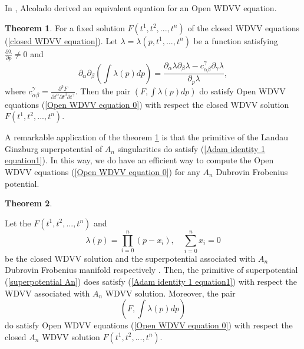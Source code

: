 \documentclass{article}
\theoremstyle{definition}
\newtheorem{theorem}{Theorem}[section]
\begin{document}
In \cite{Alcolado Adam},  Alcolado derived an equivalent equation for an Open WDVV equation.

\begin{theorem}\cite{Alcolado Adam}\label{Adam identity 10}
For a fixed solution $F(t^1, t^2, ..., t^n)$ of the closed WDVV equations (\ref{closed WDVV equation}). Let $\lambda= \lambda(p,t^1, . . . , t^n)$ be a function satisfying $\frac{\partial \lambda}{\partial p}\neq  0$ and
 \begin{equation}\label{Adam identity 1 equation1}
\partial_{\alpha}\partial_{\beta}\left(\int \lambda(p)dp\right)=\frac{ \partial_{\alpha}\lambda \partial_{\beta}\lambda-c_{\alpha\beta}^{\gamma}\partial_{\gamma}\lambda}{ \partial_{p}\lambda},
\end{equation}
where $c_{\alpha\beta}^{\gamma}=\frac{\partial^3 F}{\partial t^{\alpha}\partial t^{\beta}\partial t^{\gamma}}$.
Then the pair $(F, \int \lambda(p) dp)$ do satisfy  Open WDVV equations (\ref{Open WDVV equation 0}) with respect the closed WDVV solution $F(t^1, t^2, ..., t^n)$.


\end{theorem}


A remarkable application of the theorem \ref{Adam identity 10} is that the primitive of the Landau Ginzburg superpotential of $A_n$ singularities do satisfy (\ref{Adam identity 1 equation1}). In this way, we do have an efficient way to compute the Open WDVV equations (\ref{Open WDVV equation 0})  for any $A_n$ Dubrovin Frobenius potential.\\


\begin{theorem}\cite{Alcolado Adam}\label{Adam identity 2}

Let the  $F(t^1, t^2, ..., t^n)$ and
\begin{equation}\label{superpotential An}
\lambda(p)=\prod_{i=0}^n (p-x_i), \quad \sum_{i=0}^n x_i=0
\end{equation}
be the closed WDVV solution and the superpotential associated  with $A_n$ Dubrovin Frobenius manifold respectively . Then, the primitive of superpotential (\ref{superpotential An}) does satisfy (\ref{Adam identity 1 equation1}) with respect the WDVV associated with $A_n$ WDVV solution. Moreover, the pair
\begin{equation*}
\left(F, \int \lambda(p) dp\right)
\end{equation*}
do satisfy Open WDVV equations (\ref{Open WDVV equation 0}) with respect the closed $A_n$ WDVV solution $F(t^1, t^2, ..., t^n)$.
\end{theorem}
\end{document}
